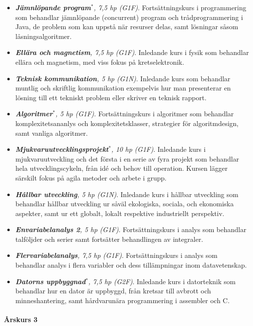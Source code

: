 \begin{itemize}
\tightlist
\item
  \emph{\textbf{Jämnlöpande program}$^*$, 7,5 hp (G1F)}. Fortsättningskurs i
  programmering som behandlar jämnlöpande (concurrent) program och
  trådprogrammering i Java, de problem som kan uppstå när resurser
  delas, samt lösningar såsom låsningsalgoritmer.
\item
  \emph{\textbf{Ellära och magnetism}, 7,5 hp (G1F)}. Inledande kurs i
  fysik som behandlar ellära och magnetism, med viss fokus på
  kretselektronik.
\item
  \emph{\textbf{Teknisk kommunikation}, 5 hp (G1N)}. Inledande kurs som
  behandlar muntlig och skriftlig kommunikation exempelvis hur man
  presenterar en lösning till ett tekniskt problem eller skriver en
  teknisk rapport.
\item
  \emph{\textbf{Algoritmer}$^*$, 5 hp (G1F)}. Fortsättningskurs i algoritmer
  som behandlar komplexitetsananlys och komplexitetsklasser, strategier
  för algoritmdesign, samt vanliga algoritmer.
\item
  \emph{\textbf{Mjukvaruutvecklingsprojekt}$^*$, 10 hp (G1F)}. Inledande
  kurs i mjukvaruutveckling och det första i en serie av fyra projekt
  som behandlar hela utvecklingscykeln, från idé och behov till
  operation. Kursen lägger särskilt fokus på agila metoder och arbete i
  grupp.
\item
  \emph{\textbf{Hållbar utveckling}, 5 hp (G1N)}. Inledande kurs i
  hållbar utveckling som behandlar hållbar utveckling ur såväl
  ekologiska, sociala, och ekonomiska aspekter, samt ur ett globalt,
  lokalt respektive industriellt perspektiv.
\item
  \emph{\textbf{Envariabelanalys 2}, 5 hp (G1F)}. Fortsättningskurs i
  analys som behandlar talföljder och serier samt fortsätter
  behandlingen av integraler.
\item
  \emph{\textbf{Flervariabelanalys}, 7,5 hp (G1F)}. Fortsättningskurs i
  analys som behandlar analys i flera variabler och dess tillämpningar
  inom datavetenskap.
\item
  \emph{\textbf{Datorns uppbyggnad}$^*$, 7,5 hp (G2F)}. Inledande kurs i
  datorteknik som behandlar hur en dator är uppbyggd, från kretsar till
  avbrott och minneshantering, samt hårdvarunära programmering i
  assembler och C.
\end{itemize}

\paragraph*{Årskurs 3}

